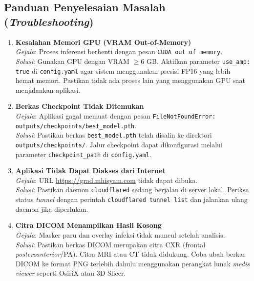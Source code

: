 \documentclass[12pt,a4paper]{article}
\begin{document}
\subsection{Panduan Penyelesaian Masalah (\textit{Troubleshooting})}

\begin{enumerate}
    \item \textbf{Kesalahan Memori GPU (VRAM Out-of-Memory)}\\
    \textit{Gejala}: Proses inferensi berhenti dengan pesan
    \texttt{CUDA out of memory}.\\
    \textit{Solusi}: Gunakan GPU dengan VRAM $\ge6$ GB. Aktifkan parameter
    \texttt{use\_amp: true} di \texttt{config.yaml} agar sistem menggunakan
    presisi FP16 yang lebih hemat memori. Pastikan tidak ada proses lain yang
    menggunakan GPU saat menjalankan aplikasi.

    \item \textbf{Berkas Checkpoint Tidak Ditemukan}\\
    \textit{Gejala}: Aplikasi gagal memuat dengan pesan
    \texttt{FileNotFoundError: outputs/checkpoints/best\_model.pth}.\\
    \textit{Solusi}: Pastikan berkas \texttt{best\_model.pth} telah disalin ke
    direktori \texttt{outputs/checkpoints/}. Jalur checkpoint dapat dikonfigurasi
    melalui parameter \texttt{checkpoint\_path} di \texttt{config.yaml}.

    \item \textbf{Aplikasi Tidak Dapat Diakses dari Internet}\\
    \textit{Gejala}: URL \url{https://grad.mhisyam.com} tidak dapat dibuka.\\
    \textit{Solusi}: Pastikan daemon \texttt{cloudflared} sedang berjalan di
    server lokal. Periksa status \textit{tunnel} dengan perintah
    \texttt{cloudflared tunnel list} dan jalankan ulang daemon jika diperlukan.

    \item \textbf{Citra DICOM Menampilkan Hasil Kosong}\\
    \textit{Gejala}: Masker paru dan overlay infeksi tidak muncul setelah analisis.\\
    \textit{Solusi}: Pastikan berkas DICOM merupakan citra CXR (frontal
    \textit{posteroanterior}/PA). Citra MRI atau CT tidak didukung. Coba ubah
    berkas DICOM ke format PNG terlebih dahulu menggunakan perangkat lunak
    \textit{medis viewer} seperti OsiriX atau 3D Slicer.
\end{enumerate}
\end{document}
